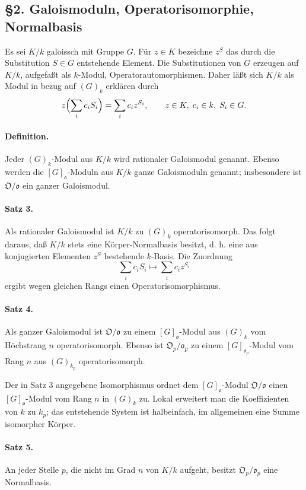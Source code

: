 \documentclass[11pt]{article}
\providecommand{\frako}{\mathfrak o}
\providecommand{\frakO}{\mathfrak O}
\begin{document}
\subsection*{§2. Galoismoduln, Operatorisomorphie, Normalbasis}

Es sei \(K/k\) galoissch mit Gruppe \(G\). Für \(z\in K\) bezeichne \(z^S\) das durch die Substitution \(S\in G\) entstehende Element. Die Substitutionen von \(G\) erzeugen auf \(K/k\), aufgefaßt als \(k\)-Modul, Operatorautomorphismen. Daher läßt sich \(K/k\) als Modul in bezug auf \((G)_k\) erklären durch
\[
        z\Bigl(\sum_i c_iS_i\Bigr)=\sum_i c_i z^{S_i},
        \qquad z\in K,\; c_i\in k,\; S_i\in G.
\]

\paragraph{Definition.}
Jeder \((G)_k\)-Modul aus \(K/k\) wird rationaler Galoismodul genannt. Ebenso werden die \([G]_{\frako}\)-Moduln aus \(K/k\) ganze Galoismoduln genannt; insbesondere ist \(\frakO/\frako\) ein ganzer Galoismodul.

\paragraph{Satz 3.}
Als rationaler Galoismodul ist \(K/k\) zu \((G)_k\) operatorisomorph. Das folgt daraus, daß \(K/k\) stets eine Körper-Normalbasis besitzt, d. h. eine aus konjugierten Elementen \(z^S\) bestehende \(k\)-Basis. Die Zuordnung
\[
        \sum_i c_iS_i\longmapsto \sum_i c_i z^{S_i}
\]
ergibt wegen gleichen Rangs einen Operatorisomorphismus.

\paragraph{Satz 4.}
Als ganzer Galoismodul ist \(\frakO/\frako\) zu einem \([G]_{\frako}\)-Modul aus \((G)_k\) vom Höchstrang \(n\) operatorisomorph. Ebenso ist \(\frakO_p/\frako_p\) zu einem \([G]_{\frako_p}\)-Modul vom Rang \(n\) aus \((G)_{k_p}\) operatorisomorph.

Der in Satz 3 angegebene Isomorphismus ordnet dem \([G]_{\frako}\)-Modul \(\frakO/\frako\) einen \([G]_{\frako}\)-Modul vom Rang \(n\) in \((G)_k\) zu. Lokal erweitert man die Koeffizienten von \(k\) zu \(k_p\); das entstehende System ist halbeinfach, im allgemeinen eine Summe isomorpher Körper.

\paragraph{Satz 5.}
An jeder Stelle \(p\), die nicht im Grad \(n\) von \(K/k\) aufgeht, besitzt \(\frakO_p/\frako_p\) eine Normalbasis.
\end{document}
